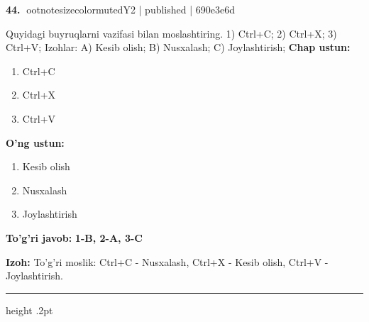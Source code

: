 \documentclass[10pt,a4paper]{article}
\begin{document}
\textbf{\color{ink}44.} {ootnotesizecolor{muted}Y2 | published | 690e3e6d}
\par
Quyidagi buyruqlarni vazifasi bilan moslashtiring.  1) Ctrl+C;  2) Ctrl+X;  3) Ctrl+V;  Izohlar: A) Kesib olish;  B) Nusxalash;  C) Joylashtirish;
\textbf{Chap ustun:}\begin{enumerate}[label=\arabic*),leftmargin=9mm]
\item Ctrl+C
\item Ctrl+X
\item Ctrl+V
\end{enumerate}
\textbf{O'ng ustun:}\begin{enumerate}[label=\Alph*),leftmargin=9mm]
\item Kesib olish
\item Nusxalash
\item Joylashtirish
\end{enumerate}
\begin{tcolorbox}[enhanced,breakable,colback=teal!4,colframe=teal!55!black,boxrule=0.45pt,arc=1.2mm,left=2.8mm,right=2.8mm,top=2mm,bottom=2mm]
\textbf{\color{teal}To'g'ri javob:} \textbf{1-B, 2-A, 3-C}
\par\smallskip
\textbf{Izoh:} To'g'ri moslik: Ctrl+C - Nusxalash, Ctrl+X - Kesib olish, Ctrl+V - Joylashtirish.
\end{tcolorbox}
\vspace{2mm}\hrule height .2pt\vspace{2mm}
\end{document}
